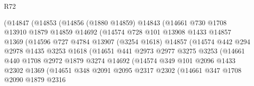 \begin{lexlean}{R72}
\begin{coremodule}
                    (@14847
                      (@14853
                        (@14856
                          (@1880 @14859)
                          @14843
                          (@14661
                            @730
                            @1708
                            @13910
                            @1879
                            @14859
                            @14692
                            (@14574
                              @728
                              @101
                              @13908
                              @1433
                              @14857
                              @1369
                              (@14596
                                @727
                                @4784
                                @13907
                                (@3254 @1618)
                                @14857
                                (@14574
                                  @442
                                  @294
                                  @2978
                                  @1435
                                  @3253
                                  @1618
                                  (@14651
                                    @441
                                    @2973
                                    @2977
                                    @3275
                                    @3253
                                    (@14661
                                      @440
                                      @1708
                                      @2972
                                      @1879
                                      @3274
                                      @14692
                                      (@14574
                                        @349
                                        @101
                                        @2096
                                        @1433
                                        @2302
                                        @1369
                                        (@14651
                                          @348
                                          @2091
                                          @2095
                                          @2317
                                          @2302
                                          (@14661
                                            @347
                                            @1708
                                            @2090
                                            @1879
                                            @2316

\end{coremodule}
\end{lexlean}
